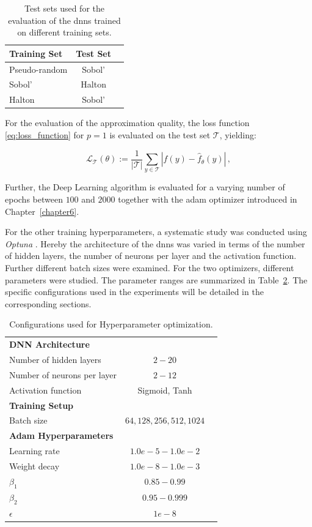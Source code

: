\begin{table}[H]
\begin{tabular}{lcc}
\toprule
\textbf{Training Set} & \textbf{Test Set} \\
\midrule
Pseudo-random & Sobol' \\
Sobol' & Halton \\
Halton & Sobol' \\
\bottomrule
\end{tabular}
\centering
\caption{Test sets used for the evaluation of the \acp{dnn} trained
on different training sets.}
\label{tab:test_set}
\end{table}

For the evaluation of the approximation quality, the loss function \eqref{eq:loss_function} for $p=1$ is evaluated on the test set $\mathcal{T}$, yielding:

\begin{equation*}
\mathcal{L}_{\mathcal{T}}(\theta) := \frac{1}{|\mathcal{T}|}\sum\limits_{y \in \mathcal{T}} |f(y) - \hat{f}_\theta(y)|\,,
\end{equation*}


Further, the Deep Learning algorithm is evaluated for a varying number of epochs
between $100$ and $2000$ together with the \ac{adam} optimizer
\cite{goodfellow2016deep} introduced in Chapter~\ref{chapter6}.

For the other training hyperparameters, a systematic study was conducted using
\emph{Optuna} \cite{akiba2019optuna}. Hereby the architecture of the \acp{dnn}
was varied in terms of the number of hidden layers, the number of neurons per
layer and the activation function. Further different batch sizes were examined.
For the two optimizers, different parameters were studied. The parameter ranges
are summarized in Table~\ref{tab:dnn_configs}. The specific configurations used
in the experiments will be detailed in the corresponding sections. 

\begin{table}[H]
\begin{tabular}{lcc}
\toprule
\textbf{DNN Architecture }& \\
Number of hidden layers & $2-20$ \\
Number of neurons per layer & $2-12$ \\
Activation function & Sigmoid, Tanh \\
\midrule
\textbf{Training Setup} & \\
Batch size & $64,128,256,512,1024$ \\
\midrule
\textbf{Adam Hyperparameters} & \\
Learning rate & $1.0e{-}5 - 1.0e{-}2$ \\
Weight decay & $1.0e{-}8 - 1.0e{-}3$ \\
$\beta_1$ & $0.85 - 0.99$ \\
$\beta_2$ & $0.95 - 0.999$ \\
$\epsilon$ & $1e-8$ \\
\midrule
\bottomrule
\end{tabular}
\centering
\caption{Configurations used for Hyperparameter optimization.}
\label{tab:dnn_configs}
\end{table}

